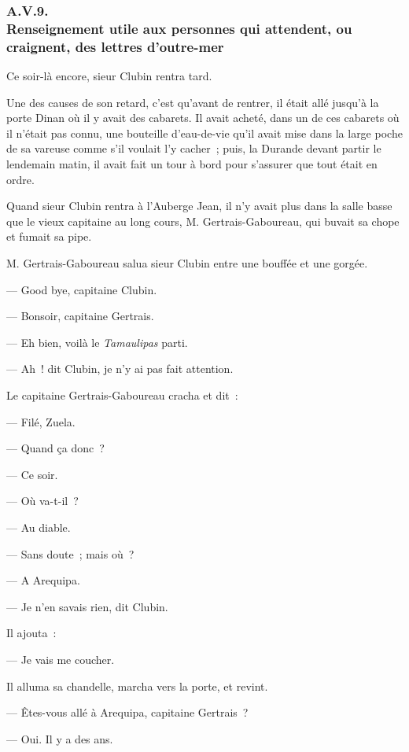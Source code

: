 \documentclass[french,twoside]{book} %
\begin{document}
 \subsubsection[{A.V.9. Renseignement utile aux personnes qui attendent, ou craignent, des lettres d’outre-mer}]{A.V.9. \\
Renseignement utile aux personnes qui attendent, ou craignent, des lettres d’outre-mer}
\noindent Ce soir-là encore, sieur Clubin rentra tard.\par
Une des causes de son retard, c’est qu’avant de rentrer, il était allé jusqu’à la porte Dinan où il y avait des cabarets. Il avait acheté, dans un de ces cabarets où il n’était pas connu, une bouteille d’eau-de-vie qu’il avait mise dans la large poche de sa vareuse comme s’il voulait l’y cacher ; puis, la Durande devant partir le lendemain matin, il avait fait un tour à bord pour s’assurer que tout était en ordre.\par
Quand sieur Clubin rentra à l’Auberge Jean, il n’y avait plus dans la salle basse que le vieux capitaine au long cours, M. Gertrais-Gaboureau, qui buvait sa chope et fumait sa pipe.\par
M. Gertrais-Gaboureau salua sieur Clubin entre une bouffée et une gorgée.\par
— Good bye, capitaine Clubin.\par
— Bonsoir, capitaine Gertrais.\par
 — Eh bien, voilà le \emph{Tamaulipas} parti.\par
— Ah ! dit Clubin, je n’y ai pas fait attention.\par
Le capitaine Gertrais-Gaboureau cracha et dit :\par
— Filé, Zuela.\par
— Quand ça donc ?\par
— Ce soir.\par
— Où va-t-il ?\par
— Au diable.\par
— Sans doute ; mais où ?\par
— A Arequipa.\par
— Je n’en savais rien, dit Clubin.\par
Il ajouta :\par
— Je vais me coucher.\par
Il alluma sa chandelle, marcha vers la porte, et revint.\par
— Êtes-vous allé à Arequipa, capitaine Gertrais ?\par
— Oui. Il y a des ans.\par
\end{document}
